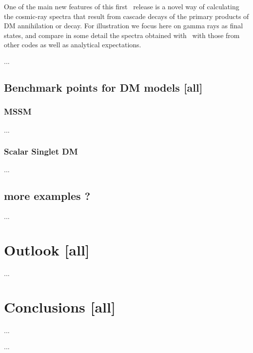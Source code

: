 One of the main new features of this first \DB\ release is a novel way of calculating the cosmic-ray spectra that result from 
cascade decays of the primary products of DM annihilation or decay. For illustration we focus here on gamma
rays as final states, and compare in some detail the spectra obtained with \DB\ with those from other codes
as well as analytical expectations.

\medskip
...


\subsection{Benchmark points for DM models {\bf [all]}}

\subsubsection{MSSM}
...

\subsubsection{Scalar Singlet DM}
...

\subsection{more examples ?}
...

\section{Outlook {\bf [all]}}
\label{out}

...

\section{Conclusions {\bf [all]} }
\label{conc}

...

\begin{acknowledgements}
...
\end{acknowledgements}



\appendix
\label{}

